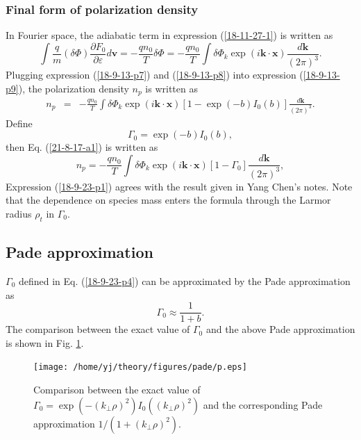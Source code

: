 \documentclass{article}
\begin{document}
\subsubsection{Final form of polarization density}

In Fourier space, the adiabatic term in expression (\ref{18-11-27-1}) is
written as
\begin{equation}
  \label{18-9-13-p8} \int \frac{q}{m} (\delta \Phi) \frac{\partial
  F_0}{\partial \varepsilon} d\mathbf{v}= - \frac{q n_0}{T} \delta \Phi = -
  \frac{q n_0}{T}  \int \delta \Phi_k \exp (i\mathbf{k} \cdot \mathbf{x})
  \frac{d\mathbf{k}}{(2 \pi)^3} .
\end{equation}
Plugging expression (\ref{18-9-13-p7}) and (\ref{18-9-13-p8}) into expression
(\ref{18-9-13-p9}), the polarization density $n_p$ is written as
\begin{eqnarray}
  n_p & = & - \frac{q n_0}{T} \int \delta \Phi_k \exp (i\mathbf{k} \cdot
  \mathbf{x}) [1 - \exp (- b) I_0 (b)] \frac{d\mathbf{k}}{(2 \pi)^3} . 
  \label{21-8-17-a1}
\end{eqnarray}
Define
\begin{equation}
  \label{18-9-23-p4} \Gamma_0 = \exp (- b) I_0 (b),
\end{equation}
then Eq. (\ref{21-8-17-a1}) is written as
\begin{equation}
  \label{18-9-23-p1} n_p = - \frac{q n_0}{T} \int \delta \Phi_k \exp
  (i\mathbf{k} \cdot \mathbf{x}) [1 - \Gamma_0] \frac{d\mathbf{k}}{(2 \pi)^3},
\end{equation}
Expression (\ref{18-9-23-p1}) agrees with the result given in Yang Chen's
notes. Note that the dependence on species mass enters the formula through the
Larmor radius $\rho_t$ in $\Gamma_0$.

\subsection{Pade approximation}

$\Gamma_0$ defined in Eq. (\ref{18-9-23-p4}) can be approximated by the Pade
approximation as
\begin{equation}
  \label{18-10-23-p1} \Gamma_0 \approx \frac{1}{1 + b} .
\end{equation}
The comparison between the exact value of $\Gamma_0$ and the above Pade
approximation is shown in Fig. \ref{18-9-23-e1}.

\begin{figure}[h]
  \texttt{[image: /home/yj/theory/figures/pade/p.eps]}
  \caption{\label{18-9-23-e1}Comparison between the exact value of $\Gamma_0 =
  \exp (- (k_{\perp} \rho)^2) I_0 ((k_{\perp} \rho)^2)$ and the corresponding
  Pade approximation $1 / (1 + (k_{\perp} \rho)^2)$.}
\end{figure}
\end{document}
